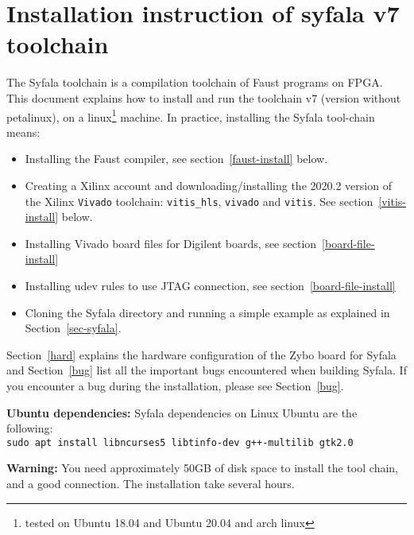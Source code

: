 \section{Installation instruction of  syfala v7 toolchain}
\label{annex}
\label{install}
The Syfala toolchain is a compilation toolchain of Faust programs on FPGA. This document explains how to install and run the toolchain v7  (version without petalinux), on a linux\footnote{tested on Ubuntu 18.04 and Ubuntu 20.04 and arch linux} machine. In practice, installing the Syfala tool-chain  means:
\begin{itemize}
\item Installing the Faust compiler, see section~\ref{faust-install} below.
\item Creating a Xilinx account and downloading/installing the 2020.2 version of the Xilinx {\tt Vivado} toolchain: {\tt vitis\_hls}, {\tt vivado} and {\tt vitis}. See section~\ref{vitis-install} below.
\item Installing Vivado board files for Digilent boards, see section~\ref{board-file-install}
\item Installing udev rules to use JTAG connection, see section~\ref{board-file-install}  
\item Cloning the Syfala directory and running a simple example as explained in Section~\ref{sec-syfala}.
\end{itemize}
Section~\ref{hard} explains the hardware configuration of the Zybo board for Syfala and Section~\ref{bug} list all the important bugs encountered when building Syfala. If you encounter a bug during the installation, please see Section~\ref{bug}.


{\bf Ubuntu dependencies:} Syfala dependencies on Linux Ubuntu are the following:\\
\texttt{sudo apt install libncurses5 libtinfo-dev g++-multilib gtk2.0}

{\bf Warning:} You need approximately 50GB of disk space to install the tool chain, and a good connection. The installation take several hours.
           

